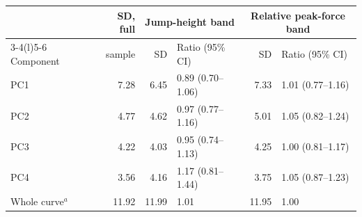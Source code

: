 \begin{tabular}{lrrlrl}
\toprule
 & SD, full & \multicolumn{2}{c}{Jump-height band} & \multicolumn{2}{c}{Relative peak-force band} \\
\cmidrule(lr){3-4}\cmidrule(l){5-6}
Component & sample & SD & Ratio (95\% CI) & SD & Ratio (95\% CI) \\
\midrule
PC1 & 7.28 & 6.45 & 0.89 (0.70--1.06) & 7.33 & 1.01 (0.77--1.16) \\
PC2 & 4.77 & 4.62 & 0.97 (0.77--1.16) & 5.01 & 1.05 (0.82--1.24) \\
PC3 & 4.22 & 4.03 & 0.95 (0.74--1.13) & 4.25 & 1.00 (0.81--1.17) \\
PC4 & 3.56 & 4.16 & 1.17 (0.81--1.44) & 3.75 & 1.05 (0.87--1.23) \\
Whole curve$^a$ & 11.92 & 11.99 & 1.01 & 11.95 & 1.00 \\
\bottomrule
\end{tabular}
